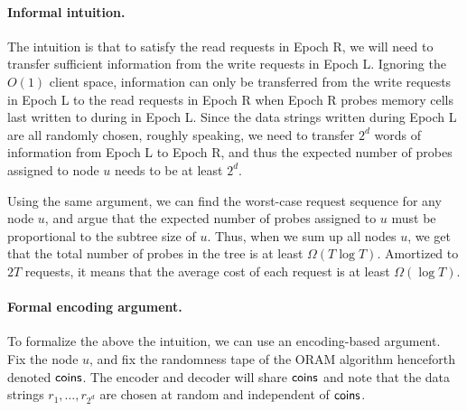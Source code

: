 
\paragraph{Informal intuition.}
The intuition is that to satisfy the read requests in %
Epoch R, 
we will need to transfer sufficient information
from the write requests in %
Epoch L.
Ignoring the %
$O(1)$ client space, 
information can only be transferred from
the write requests in %
Epoch L 
to the read requests in %
Epoch R
when %
Epoch R probes memory cells last written to 
during %
in Epoch L. 
Since the data strings written during Epoch L
are all randomly chosen,  roughly speaking, 
we need to transfer $2^d$ words of  
information from Epoch L to Epoch R, and thus
the expected number of probes assigned to node $u$
needs to be at least $2^d$.

Using the same argument, we can find the worst-case
request sequence for any node $u$, and argue
that the expected number  
of probes assigned to $u$ 
must be proportional to the subtree size of $u$.
Thus, when we sum up all nodes $u$, we get
that the total number of probes in the tree is 
at least $\Omega(T  \log T)$.
Amortized to $2T$ requests, it means that 
the average 
cost of each request 
is at least $\Omega(\log T)$.

\paragraph{Formal encoding argument.}
To formalize the above the intuition, we can use an encoding-based argument.
Fix the node $u$, 
and fix the randomness tape
of the ORAM algorithm henceforth denoted ${\sf coins}$.
The encoder and decoder will share ${\sf coins}$
and note that 
the data strings $r_1, \ldots, r_{2^d}$ are chosen at random 
and independent of ${\sf coins}$.



